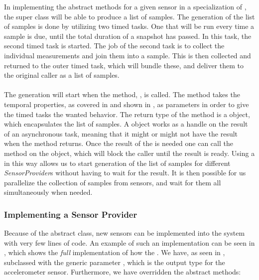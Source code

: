 In implementing the abstract methods for a given sensor in a specialization of , the super class will be able to produce a list of samples. The generation of the list of samples is done by utilizing two timed tasks. One that will be run every time a sample is due, until the total duration of a snapshot has passed. In this task, the second timed task is started. The job of the second task is to collect the individual measurements and join them into a sample. This is then collected and returned to the outer timed task, which will bundle these, and deliver them to the original caller as a list of samples. 
\\\\
The generation will start when the method, , is called. The method takes the temporal properties, as covered in  and shown in , as parameters in order to give the timed tasks the wanted behavior. The return type of the method is a  object, which encapsulates the list of samples. A  object works as a handle on the result of an asynchronous task, meaning that it might or might not have the result when the method returns. Once the result of the  is needed one can call the  method on the object, which will block the caller until the result is ready. Using a  in this way allows us to start generation of the list of samples for different \emph{SensorProvider}s without having to wait for the result. It is then possible for us parallelize the collection of samples from sensors, and wait for them all simultaneously when needed. %

\subsubsection{Implementing a Sensor Provider}
Because of the abstract  class, new sensors can be implemented into the system with very few lines of code. An example of such an implementation can be seen in , which shows the \emph{full} implementation of how the . We have, as seen in , subclassed  with the generic parameter , which is the output type for the accelerometer sensor. Furthermore, we have overridden the abstract methods: 

